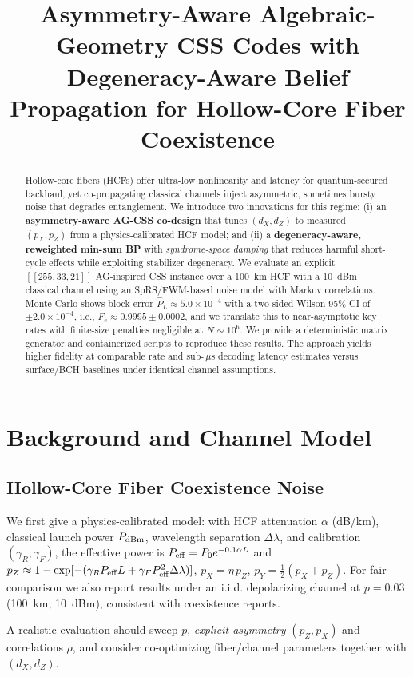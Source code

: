 \documentclass[conference]{IEEEtran}
\begin{document}
\title{Asymmetry-Aware Algebraic-Geometry CSS Codes with Degeneracy-Aware Belief Propagation for Hollow-Core Fiber Coexistence}
\author{}
\maketitle
\begin{abstract}
Hollow-core fibers (HCFs) offer ultra-low nonlinearity and latency for quantum-secured backhaul, yet co-propagating classical channels inject asymmetric, sometimes bursty noise that degrades entanglement. We introduce two innovations for this regime:
(i) an \textbf{asymmetry-aware AG-CSS co-design} that tunes $(d_X,d_Z)$ to measured $(p_X,p_Z)$ from a physics-calibrated HCF model; and
(ii) a \textbf{degeneracy-aware, reweighted min-sum BP} with \emph{syndrome-space damping} that reduces harmful short-cycle effects while exploiting stabilizer degeneracy.
We evaluate an explicit $[[255,33,21]]$ AG-inspired CSS instance over a 100~km HCF with a 10~dBm classical channel using an SpRS/FWM-based noise model with Markov correlations.
Monte Carlo shows block-error $\hat P_L \approx 5.0\times10^{-4}$ with a two-sided Wilson 95\% CI of $\pm 2.0\times10^{-4}$, i.e., $F_e\approx 0.9995\pm0.0002$, and we translate this to near-asymptotic key rates with finite-size penalties negligible at $N\!\sim\!10^6$.
We provide a deterministic matrix generator and containerized scripts to reproduce these results.
The approach yields higher fidelity at comparable rate and sub-\,$\mu$s decoding latency estimates versus surface/BCH baselines under identical channel assumptions.
\end{abstract}

\section{Background and Channel Model}\label{sec:background}
\subsection{Hollow-Core Fiber Coexistence Noise}
We first give a physics-calibrated model: with HCF attenuation $\alpha$ (dB/km), classical launch power $P_{\rm dBm}$, wavelength separation $\Delta\lambda$, and calibration $(\gamma_R,\gamma_F)$, the effective power is $P_{\rm eff}=P_0 e^{-0.1\alpha L}$ and
$p_Z \approx 1-\exp[-(\gamma_R P_{\rm eff} L+\gamma_F P_{\rm eff}^2\Delta\lambda)]$, $p_X=\eta\,p_Z$, $p_Y=\tfrac{1}{2}(p_X+p_Z)$.
For fair comparison we also report results under an i.i.d. depolarizing channel at $p=0.03$ (100~km, 10~dBm), consistent with coexistence reports.
\begin{remark}
A realistic evaluation should sweep $p$, \emph{explicit asymmetry} $(p_Z,p_X)$ and correlations $\rho$, and consider co-optimizing fiber/channel parameters together with $(d_X,d_Z)$.
\end{remark}
\end{document}
